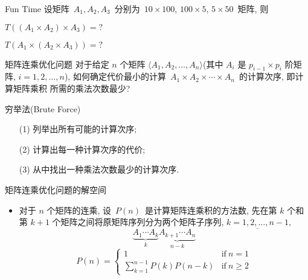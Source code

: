 \documentclass[fontset=fandol,UTF8,fleqn]{beamer}
\begin{document}
\begin{frame}{Fun Time}
 设矩阵~$A_1, A_2, A_3$~分别为~$10\times 100$, $100\times 5$,  $5\times
  50$~矩阵, 则

$  T((A_1\times A_2) \times A_3) = ?$

$T(A_1\times (A_2\times A_3))= ? $

\end{frame}

\begin{frame}{矩阵连乘优化问题}
对于给定 $n$ 个矩阵 $\langle A_1, A_2, \ldots, A_n
\rangle$(其中 $A_i$ 是 $p_{i-1}\times p_i$ 阶矩阵, $i=1,2,\ldots, n$), 如何确定代价最小的计算~$A_1\times A_2 \times \cdots \times A_n$~的计算次序, 即计算矩阵乘积
所需的乘法次数最少?
\end{frame}

\begin{frame}{穷举法(Brute Force)}
  \begin{itemize}[<+-|alert@+>]
\item[(1)]  列举出所有可能的计算次序;  
\item[(2)]  计算出每一种计算次序的代价;  
\item[(3)]  从中找出一种乘法次数最少的计算次序. 
\end{itemize}
\end{frame}

\begin{frame}{矩阵连乘优化问题的解空间}
  \begin{itemize}[<+-|alert@+>]
\item 对于 $n$ 个矩阵的连乘, 设~$P(n)$~是计算矩阵连乘积的方法数, 先在第 $k$ 个和第 $k+1$ 个矩阵之间将原矩阵序列分为两个矩阵子序列, $\underline{k=1,2,\ldots, n-1}$,  
\begin{displaymath}
 \underbrace{A_1 \cdots   A_k }_{k} \underbrace{A_{k+1} \cdots  A_n }_{n-k} 
\end{displaymath}
\begin{displaymath}
    P(n)=\left\{\begin{array}{ll}
1 & \textrm{if}\ n = 1\\
\sum_{k=1}^{n-1}P(k)P(n-k) &  \textrm{if}\ n \geq 2
\end{array}\right. 
\end{displaymath}
\end{itemize}
\end{frame}
\end{document}

